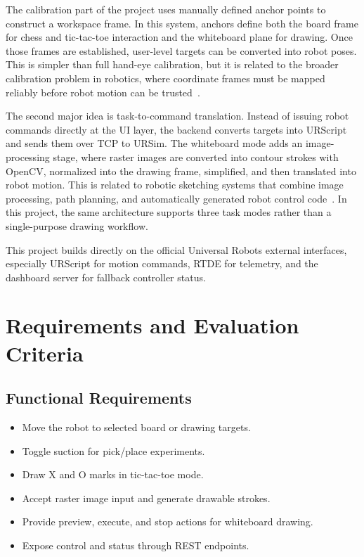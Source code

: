 \documentclass[12pt]{article}
\begin{document}
The calibration part of the project uses manually defined anchor points to construct a workspace frame. In this system, anchors define both the board frame for chess and tic-tac-toe interaction and the whiteboard plane for drawing. Once those frames are established, user-level targets can be converted into robot poses. This is simpler than full hand-eye calibration, but it is related to the broader calibration problem in robotics, where coordinate frames must be mapped reliably before robot motion can be trusted~\cite{tsai-lenz,calibration-review}.

The second major idea is task-to-command translation. Instead of issuing robot commands directly at the UI layer, the backend converts targets into URScript and sends them over TCP to URSim. The whiteboard mode adds an image-processing stage, where raster images are converted into contour strokes with OpenCV, normalized into the drawing frame, simplified, and then translated into robot motion. This is related to robotic sketching systems that combine image processing, path planning, and automatically generated robot control code~\cite{robotic-sketching}. In this project, the same architecture supports three task modes rather than a single-purpose drawing workflow.

This project builds directly on the official Universal Robots external interfaces, especially URScript for motion commands, RTDE for telemetry, and the dashboard server for fallback controller status.

\section{Requirements and Evaluation Criteria}
\subsection{Functional Requirements}
\begin{itemize}[leftmargin=*]
\item Move the robot to selected board or drawing targets.
\item Toggle suction for pick/place experiments.
\item Draw X and O marks in tic-tac-toe mode.
\item Accept raster image input and generate drawable strokes.
\item Provide preview, execute, and stop actions for whiteboard drawing.
\item Expose control and status through REST endpoints.
\end{itemize}
\end{document}
